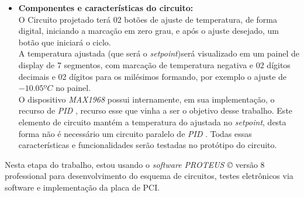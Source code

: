 \begin{itemize}
\item \textbf{Componentes e características do circuito:}\\

O Circuito projetado terá 02 botões de ajuste de temperatura, de forma digital, iniciando a marcação em zero grau, e após o ajuste desejado, um botão que iniciará o ciclo. \\
A temperatura ajustada (que será o \emph{setpoint})será visualizado em um painel de display de 7 segmentos, com marcação de temperatura negativa e 02 dígitos decimais e 02 dígitos para os milésimos formando, por exemplo o ajuste de $ -10.05 ºC $ no painel.\\
O dispositivo \emph{MAX1968} possui internamente, em sua implementação, o recurso de\emph{ PID }, recurso esse que vinha a ser o objetivo desse trabalho. Este elemento de circuito mantém  a temperatura do ajustada no \emph{setpoint}, desta forma não é necessário um circuito paralelo de \emph{PID }. Todas essas características e funcionalidades serão testadas no protótipo do circuito. \\


\end{itemize}

Nesta etapa do trabalho, estou usando o \emph{software PROTEUS \copyright  } versão 8 professional  para desenvolvimento do esquema de circuitos, testes eletrônicos via software e implementação da placa de PCI. \\

 